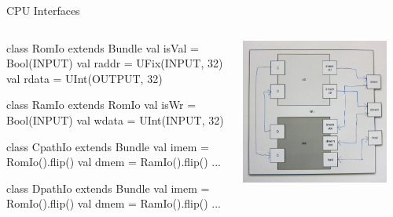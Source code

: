 \documentclass[xcolor=pdflatex,dvipsnames,table]{beamer}
\begin{document}
\begin{frame}[fragile]{CPU Interfaces}
\begin{columns}

\begin{scala}
class RomIo extends Bundle {
  val isVal = Bool(INPUT)
  val raddr = UFix(INPUT, 32)
  val rdata = UInt(OUTPUT, 32) 
}

class RamIo extends RomIo {
  val isWr  = Bool(INPUT)
  val wdata = UInt(INPUT, 32) 
}

class CpathIo extends Bundle {
  val imem = RomIo().flip()
  val dmem = RamIo().flip()
  ... }

class DpathIo extends Bundle {
  val imem = RomIo().flip()
  val dmem = RamIo().flip()
  ... }
\end{scala}


\begin{center}
\includegraphics[width=0.9\textwidth]{../tutorial/figs/cpu.png} 
\end{center}

\end{columns}
\end{frame}
\end{document}
